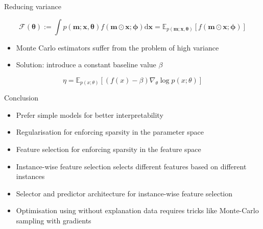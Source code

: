 \documentclass[11pt,compress,t,notes=noshow, aspectratio=169, xcolor=table]{beamer}
\begin{document}
\begin{frame}{Reducing variance}
  
  \begin{equation*}
     \mathcal{F}(\boldsymbol{\theta}):=\int p(\mathbf{m} ; \mathbf{x}, \boldsymbol{\theta}) f(\mathbf{m} \odot \mathbf{x} ; \boldsymbol{\phi}) \mathrm{d} \mathbf{x}=\mathbb{E}_{p(\mathbf{m} ; \mathbf{x}, \boldsymbol{\theta})}[f(\mathbf{m} \odot \mathbf{x} ; \boldsymbol{\phi})]
\end{equation*}

  \bigskip
  \begin{itemize}
      \item Monte Carlo estimators suffer from the problem of high variance
      \item Solution: introduce a constant baseline value $\beta$
  \end{itemize}
  \bigskip
 
 
 \begin{equation*}
     \eta = \mathbb{E}_{p(x;\theta)}[(f(x) - \beta)\nabla_\theta \log p(x;\theta)]
 \end{equation*} 
  
  
  
\end{frame}

\begin{frame}[c]{Conclusion}
    \begin{itemize}
        \item Prefer simple models for better interpretability
        \item Regularisation for enforcing sparsity in the parameter space
        \item Feature selection for enforcing sparsity in the feature space
        \item Instance-wise feature selection selects different features based on different instances
        \item Selector and predictor architecture for instance-wise feature selection
        \item Optimisation using without explanation data requires tricks like Monte-Carlo sampling
with gradients
    \end{itemize}
\end{frame}
\end{document}
